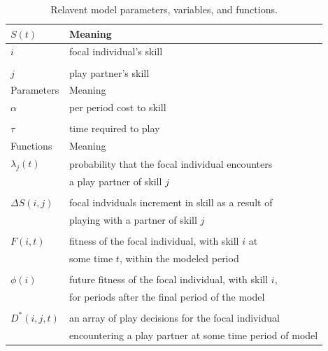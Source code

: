 \documentclass[12pt, letterpaper, fleqn]{article}
\begin{document}
\begin{table}[h]
\caption{Relavent model parameters, variables, and functions.}
\centering
\begin{tabular}{l l}
\hline
$S(t)$ & Meaning \\ 
\hline 
$i$ & focal individual's skill \\ 
\\
$j$ & play partner's skill \\
\hline 
Parameters & Meaning \\
\hline
$\alpha$ & per period cost to skill\\
\\
$\tau$ & time required to play \\
\hline
Functions & Meaning \\
\hline
$\lambda_j(t)$ & probability that the focal individual encounters \\ 
$ $ & a play partner of skill $j$\\
\\
$\Delta S(i,j)$ & focal indviduals increment in skill as a result of \\ 
$ $ & playing with a partner of skill $j$\\
\\
$F(i,t)$ & fitness of the focal individual, with skill $i$ at \\
$ $ & some time $t$, within the modeled period \\
\\
$\phi(i)$ & future fitness of the focal individual, with skill $i$, \\
$ $ &  for periods after the final period of the model\\
\\
$D^*(i,j,t)$ & an array of play decisions for the focal individual \\
$ $ & encountering a play partner at some time period of model \\ 

\hline
\end{tabular}

\label{Tab:param}
\end{table}
        
\end{document}
